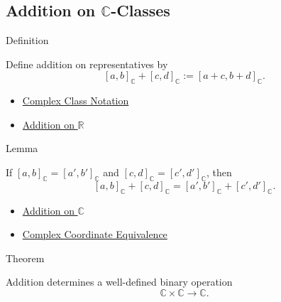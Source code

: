 \subsection*{Addition on $\mathbb{C}$-Classes}

\begin{definitionbox}{Definition}
\begin{definition}
\label{def:addition-on-c-classes}
Define addition on representatives by
\[
[a,b]_{\mathbb{C}}+[c,d]_{\mathbb{C}}
:=[a+c,b+d]_{\mathbb{C}}.
\]
\end{definition}
\end{definitionbox}

\begin{dependencies}
\begin{itemize}
  \item \hyperref[def:complex-class-notation]{Complex Class Notation}
  \item \hyperref[def:addition-on-r]{Addition on $\mathbb{R}$}
\end{itemize}
\end{dependencies}

\begin{lemmabox}{Lemma}
\begin{lemma}
\label{lem:addition-on-c-respects-equivalence}
If $[a,b]_{\mathbb{C}}=[a',b']_{\mathbb{C}}$ and
$[c,d]_{\mathbb{C}}=[c',d']_{\mathbb{C}}$, then
\[
[a,b]_{\mathbb{C}}+[c,d]_{\mathbb{C}}
=
[a',b']_{\mathbb{C}}+[c',d']_{\mathbb{C}}.
\]
\end{lemma}
\end{lemmabox}

\begin{dependencies}
\begin{itemize}
  \item \hyperref[def:addition-on-c-classes]{Addition on $\mathbb{C}$}
  \item \hyperref[def:complex-coordinate-equivalence]{Complex Coordinate Equivalence}
\end{itemize}
\end{dependencies}

\begin{theorembox}{Theorem}
\begin{theorem}
\label{thm:addition-on-c-well-defined}
Addition determines a well-defined binary operation
\[
\mathbb{C}\times\mathbb{C}\to\mathbb{C}.
\]
\end{theorem}
\end{theorembox}

